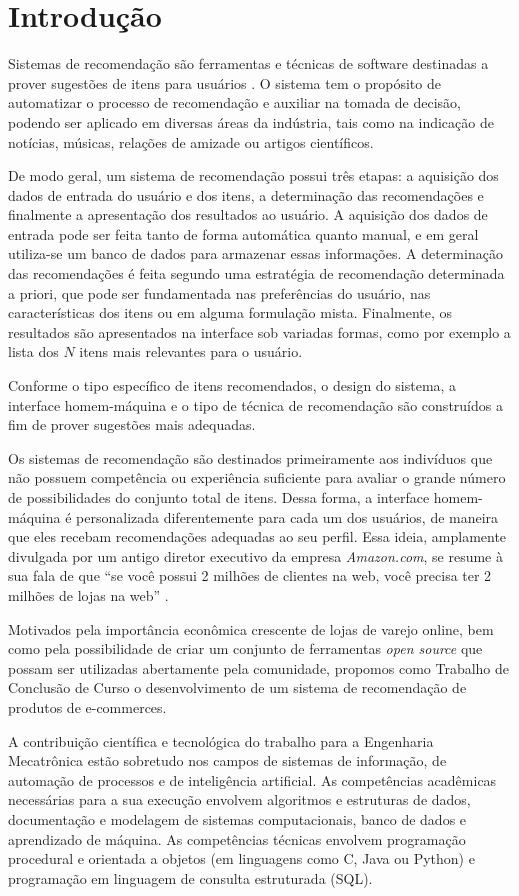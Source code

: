 \chapter[Introdução]{Introdução}
\label{chap:introducao}

Sistemas de recomendação são ferramentas e técnicas de software destinadas a prover sugestões de itens para usuários \cite{ricci2011introduction-chap1}. O sistema tem o propósito de automatizar o processo de recomendação e auxiliar na tomada de decisão, podendo ser aplicado em diversas áreas da indústria, tais como na indicação de notícias, músicas, relações de amizade ou artigos científicos.

De modo geral, um sistema de recomendação possui três etapas: a aquisição dos dados de entrada do usuário e dos itens, a determinação das recomendações e finalmente a apresentação dos resultados ao usuário. A aquisição dos dados de entrada pode ser feita tanto de forma automática quanto manual, e em geral utiliza-se um banco de dados para armazenar essas informações. A determinação das recomendações é feita segundo uma estratégia de recomendação determinada a priori, que pode ser fundamentada nas preferências do usuário, nas características dos itens ou em alguma formulação mista. Finalmente, os resultados são apresentados na interface sob variadas formas, como por exemplo a lista dos $N$ itens mais relevantes para o usuário.   

Conforme o tipo específico de itens recomendados, o design do sistema, a interface homem-máquina e o tipo de técnica de recomendação são construídos a fim de prover sugestões mais adequadas.

Os sistemas de recomendação são destinados primeiramente aos indivíduos que não possuem competência ou experiência suficiente para avaliar o grande número de possibilidades do conjunto total de itens. Dessa forma, a interface homem-máquina é personalizada diferentemente para cada um dos usuários, de maneira que eles recebam recomendações adequadas ao seu perfil. Essa ideia, amplamente divulgada por um antigo diretor executivo da empresa \textit{Amazon.com}, se resume à sua fala de que ``se você possui 2 milhões de clientes na web, você precisa ter 2 milhões de lojas na web'' \cite{schafer1999recommender}. 

Motivados pela importância econômica crescente de lojas de varejo online, bem como pela possibilidade de criar um conjunto de ferramentas \textit{open source} que possam ser utilizadas abertamente pela comunidade, propomos como Trabalho de Conclusão de Curso o desenvolvimento de um sistema de recomendação de produtos de e-commerces.  

A contribuição científica e tecnológica do trabalho para a Engenharia Mecatrônica estão sobretudo nos campos de sistemas de informação, de automação de processos e de inteligência artificial. As competências acadêmicas necessárias para a sua execução envolvem algoritmos e estruturas de dados, documentação e modelagem de sistemas computacionais, banco de dados e aprendizado de máquina. As competências técnicas envolvem programação procedural e orientada a objetos (em linguagens como C, Java ou Python) e programação em linguagem de consulta estruturada (SQL). 